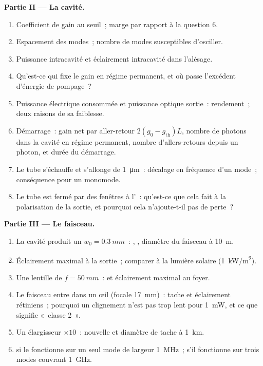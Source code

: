 \begin{problem}
\textbf{Partie II --- La cavité.}
\begin{enumerate}[resume]
  \item Coefficient de gain au seuil~; marge par rapport à la question 6.
  \item Espacement des modes~; nombre de modes susceptibles d'osciller.
  \item Puissance intracavité et éclairement intracavité dans l'alésage.
  \item Qu'est-ce qui fixe le gain en régime permanent, et où passe l'excédent
        d'énergie de pompage~?
  \item Puissance électrique consommée et puissance optique sortie~: rendement~; deux
        raisons de sa faiblesse.
  \item Démarrage~: gain net par aller-retour $2(g_0 - g_{\text{th}})L$,
        nombre de photons dans la cavité en régime permanent, nombre
        d'allers-retours depuis un photon, et durée du démarrage.
  \item Le tube s'échauffe et s'allonge de \qty{1}{\micro m}~: décalage en fréquence
        d'un mode~; conséquence pour un  monomode.
  \item Le tube est fermé par des fenêtres à l'~: qu'est-ce que
        cela fait à la polarisation de la sortie, et pourquoi cela n'ajoute-t-il pas
        de perte~?
\end{enumerate}

\textbf{Partie III --- Le faisceau.}
\begin{enumerate}[resume]
  \item La cavité produit un  $w_0 = \qty{0.3}{mm}$~: , , diamètre du faisceau à \qty{10}{m}.
  \item Éclairement maximal à la sortie~; comparer à la lumière solaire
        (\qty{1}{kW/m^2}).
  \item Une lentille de $f = \qty{50}{mm}$~:  et éclairement maximal au
        foyer.
  \item Le faisceau entre dans un œil (focale \qty{17}{mm})~: tache et éclairement
        rétiniens~; pourquoi un clignement n'est pas trop lent pour \qty{1}{mW},
        et ce que signifie «~classe 2~».
  \item Un élargisseur $\times 10$~: nouvelle  et diamètre de tache
        à \qty{1}{km}.
  \item {} si le  fonctionne sur un seul mode de largeur
        \qty{1}{MHz}~; s'il fonctionne sur trois modes couvrant \qty{1}{GHz}.
\end{enumerate}


\end{problem}

